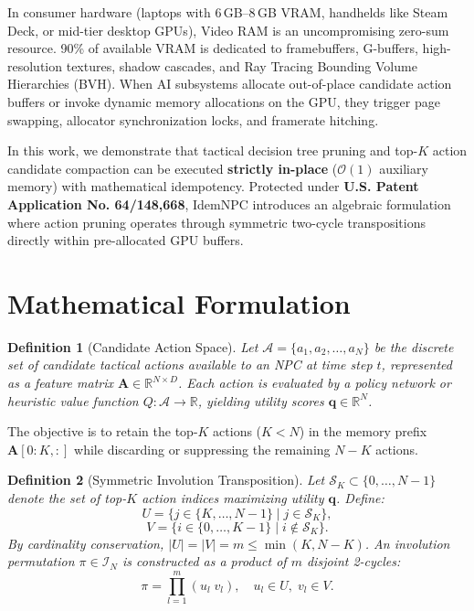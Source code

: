 \documentclass[journal,10pt,twocolumn]{article}
\newtheorem{definition}{Definition}
\begin{document}
In consumer hardware (laptops with 6\,GB--8\,GB VRAM, handhelds like Steam Deck, or mid-tier desktop GPUs), Video RAM is an uncompromising zero-sum resource. 90\% of available VRAM is dedicated to framebuffers, G-buffers, high-resolution textures, shadow cascades, and Ray Tracing Bounding Volume Hierarchies (BVH). When AI subsystems allocate out-of-place candidate action buffers or invoke dynamic memory allocations on the GPU, they trigger page swapping, allocator synchronization locks, and framerate hitching.

In this work, we demonstrate that tactical decision tree pruning and top-$K$ action candidate compaction can be executed \textbf{strictly in-place} ($\mathcal{O}(1)$ auxiliary memory) with mathematical idempotency. Protected under \textbf{U.S. Patent Application No. 64/148,668}, IdemNPC introduces an algebraic formulation where action pruning operates through symmetric two-cycle transpositions directly within pre-allocated GPU buffers.

\section{Mathematical Formulation}
\begin{definition}[Candidate Action Space]
Let $\mathcal{A} = \{a_1, a_2, \dots, a_N\}$ be the discrete set of candidate tactical actions available to an NPC at time step $t$, represented as a feature matrix $\mathbf{A} \in \mathbb{R}^{N \times D}$. Each action is evaluated by a policy network or heuristic value function $Q: \mathcal{A} \to \mathbb{R}$, yielding utility scores $\mathbf{q} \in \mathbb{R}^N$.
\end{definition}

The objective is to retain the top-$K$ actions ($K < N$) in the memory prefix $\mathbf{A}[0:K, :]$ while discarding or suppressing the remaining $N-K$ actions.

\begin{definition}[Symmetric Involution Transposition]
Let $\mathcal{S}_K \subset \{0, \dots, N-1\}$ denote the set of top-$K$ action indices maximizing utility $\mathbf{q}$. Define:
\begin{equation}
U = \{j \in \{K, \dots, N-1\} \mid j \in \mathcal{S}_K\},
\end{equation}
\begin{equation}
V = \{i \in \{0, \dots, K-1\} \mid i \notin \mathcal{S}_K\}.
\end{equation}
By cardinality conservation, $|U| = |V| = m \le \min(K, N-K)$. An involution permutation $\pi \in \mathcal{I}_N$ is constructed as a product of $m$ disjoint 2-cycles:
\begin{equation}
\pi = \prod_{l=1}^m (u_l \; v_l), \quad u_l \in U, \; v_l \in V.
\end{equation}
\end{definition}
\end{document}
